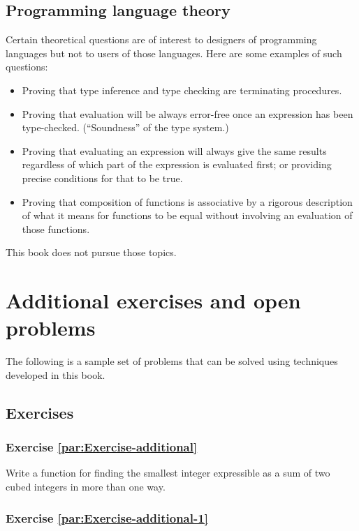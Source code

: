 \subsection{Programming language theory}

Certain theoretical questions are of interest to designers of programming
languages but not to users of those languages. Here are some examples
of such questions:
\begin{itemize}
\item Proving that type inference and type checking are terminating procedures.
\item Proving that evaluation will be always error-free once an expression
has been type-checked. (\textsf{``}Soundness\textsf{''} of the type system.)
\item Proving that evaluating an expression will always give the same results
regardless of which part of the expression is evaluated first; or
providing precise conditions for that to be true.
\item Proving that composition of functions is associative by a rigorous
description of what it means for functions to be equal without involving
an evaluation of those functions.
\end{itemize}
This book does not pursue those topics.

\section{Additional exercises and open problems\label{chap:Exercises-in-AFTT}}

The following is a sample set of problems that can be solved using
techniques developed in this book.

\subsection{Exercises}

\subsubsection{Exercise \label{par:Exercise-additional}\ref{par:Exercise-additional}}

Write a function for finding the smallest integer expressible as a
sum of two cubed integers in more than one way.

\subsubsection{Exercise \label{par:Exercise-additional-1}\ref{par:Exercise-additional-1}}

